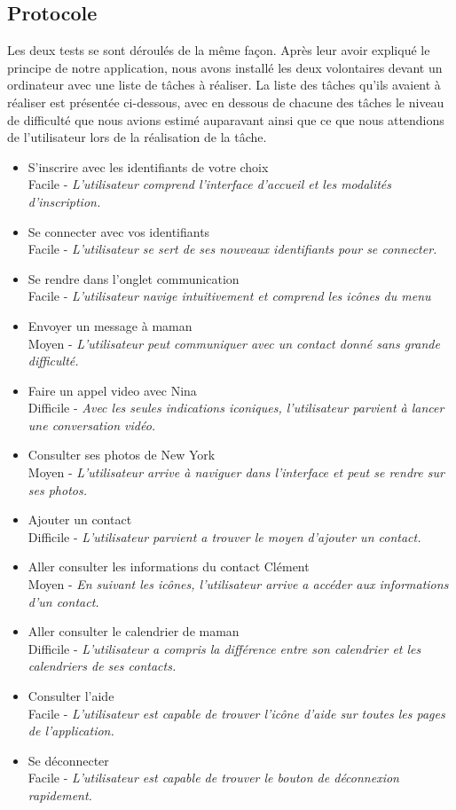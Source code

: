 \documentclass[11pt]{article}
\begin{document}
\subsection{Protocole}
Les deux tests se sont déroulés de la même façon. Après leur avoir expliqué le principe de notre application, nous avons installé les deux volontaires devant un ordinateur avec une liste de tâches à réaliser. La liste des tâches qu'ils avaient à réaliser est présentée ci-dessous, avec en dessous de chacune des tâches le niveau de difficulté que nous avions estimé auparavant ainsi que ce que nous attendions de l'utilisateur lors de la réalisation de la tâche.

\begin{itemize}
\item S’inscrire avec les identifiants de votre choix \\ Facile - \textit{L'utilisateur comprend l'interface d'accueil et les modalités d'inscription.}
\item Se connecter avec vos identifiants \\ Facile - \textit{L'utilisateur se sert de ses nouveaux identifiants pour se connecter.}
\item Se rendre dans l’onglet communication \\ Facile -  \textit{L'utilisateur navige intuitivement et comprend les icônes du menu}
\item Envoyer un message à maman \\ Moyen - \textit{L'utilisateur peut communiquer avec un contact donné sans grande difficulté.}
\item Faire un appel video avec Nina \\ Difficile - \textit{Avec les seules indications iconiques, l'utilisateur parvient à lancer une conversation vidéo.}
\item Consulter ses photos de New York \\ Moyen -  \textit{L'utilisateur arrive à naviguer dans l'interface et peut se rendre sur ses photos.}
\item Ajouter un contact \\  Difficile -  \textit{L'utilisateur parvient a trouver le moyen d'ajouter un contact.}
\item Aller consulter les informations du contact Clément \\ Moyen - \textit{En suivant les icônes, l'utilisateur arrive a accéder aux informations d'un contact.}
\item Aller consulter le calendrier de maman \\ Difficile - \textit{L'utilisateur a compris la différence entre son calendrier et les calendriers de ses contacts.}
\item Consulter l’aide \\ Facile - \textit{L'utilisateur est capable de trouver l'icône d'aide sur toutes les pages de l'application.}
\item Se déconnecter \\ Facile - \textit{L'utilisateur est capable de trouver le bouton de déconnexion rapidement.}
\end{itemize}
\end{document}
